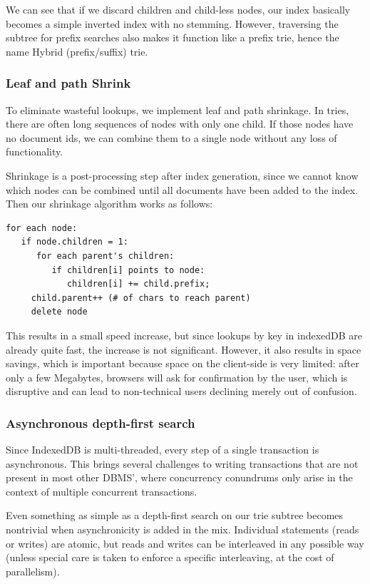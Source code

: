 \documentclass{vldb}
\begin{document}
We can see that if we discard children and child-less nodes, our index basically becomes a simple inverted index with no stemming. However, traversing the subtree for prefix searches also makes it function like a prefix trie, hence the name Hybrid (prefix/suffix) trie.

\subsubsection{Leaf and path Shrink}

To eliminate wasteful lookups, we implement leaf and path shrinkage. In tries, there are often long sequences of nodes with only one child. If those nodes have no document ids, we can combine them to a single node without any loss of functionality.

Shrinkage is a post-processing step after index generation, since we cannot know which nodes can be combined until all documents have been added to the index. Then our shrinkage algorithm works as follows:

\begin{verbatim}
for each node: 
   if node.children = 1:
      for each parent's children:
         if children[i] points to node:
     	    children[i] += child.prefix;
     child.parent++ (# of chars to reach parent)
     delete node
\end{verbatim}

This results in a small speed increase, but since lookups by key in indexedDB are already quite fast, the increase is not significant. However, it also results in space savings, which is important because space on the client-side is very limited: after only a few Megabytes, browsers will ask for confirmation by the user, which is disruptive and can lead to non-technical users declining merely out of confusion.

\subsubsection{Asynchronous depth-first search}

Since IndexedDB is multi-threaded, every step of a single transaction is asynchronous. This brings several challenges to writing transactions that are not present in most other DBMS', where concurrency conundrums only arise in the context of multiple concurrent transactions.

Even something as simple as a depth-first search on our trie subtree becomes nontrivial when asynchronicity is added in the mix. Individual statements (reads or writes) are atomic, but reads and writes can be interleaved in any possible way (unless special care is taken to enforce a specific interleaving, at the cost of parallelism).
\end{document}
